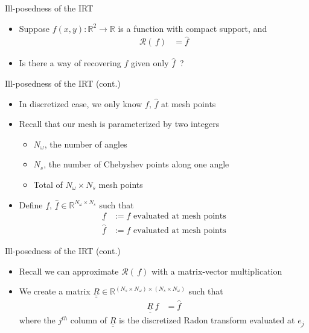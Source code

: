 \documentclass{beamer}
\newcommand{\bunderline}[1]{\underline{#1}}
\renewcommand{\vec}[1]{{\bunderline{#1}}}
\newcommand{\mat}[1]{{\bunderline{\bunderline{#1}}}}
\begin{document}
\begin{frame}{Ill-posedness of the IRT}
    \begin{itemize}
        \item Suppose $f(x, y): \mathbb{R}^{2} \rightarrow \mathbb{R}$ is a function with compact support, and
        \begin{align*}
            \mathcal{R}(\,f) & = \widehat{f}
        \end{align*}
        \item Is there a way of recovering $f$ given only $\widehat{f}$~?
    \end{itemize}
\end{frame}

\begin{frame}{Ill-posedness of the IRT (cont.)}
	\begin{itemize}
	    \item In discretized case, we only know $f, \, \widehat{f}$ at mesh points
		\item Recall that our mesh is parameterized by two integers
		\begin{itemize}
			\item $N_{\omega}$, the number of angles
			\item $N_{s}$, the number of Chebyshev points along one angle
			\item Total of $N_{\omega} \times N_{s}$ mesh points
		\end{itemize}
		\item Define $\vec{f}, \, \widehat{\vec{f}} \in \mathbb{R}^{N_{\omega} \times N_{s}}$
		such that 
		\begin{align*}
		    \vec{f} & := \text{$f$ evaluated at mesh points} \\
		    \widehat{\vec{f}} & := \text{$\widehat{f}$ evaluated at mesh points}
		\end{align*}
	\end{itemize}
\end{frame}

\begin{frame}{Ill-posedness of the IRT (cont.)}
    \begin{itemize}
        \item Recall we can approximate $\mathcal{R}(\,f)$ with a matrix-vector multiplication
        \item We create a matrix $\mat{R} \in \mathbb{R}^{(N_{s} \times N_{\omega}) \times (N_{s} \times N_{\omega})}$ such that
		\begin{align*}
		    \mat{R} \, \vec{f} & = \widehat{\vec{f}}
		\end{align*}
		where the $j^{th}$ column of $\mat{R}$ is the discretized Radon transform evaluated at $\vec{e_{j}}$
    \end{itemize}
\end{frame}
\end{document}

